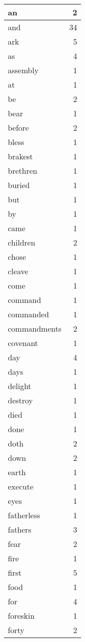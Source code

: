\begin{center}
\begin{longtable}{l|r}
an & 2 \\ \hline
and & 34 \\ \hline
ark & 5 \\ \hline
as & 4 \\ \hline
assembly & 1 \\ \hline
at & 1 \\ \hline
be & 2 \\ \hline
bear & 1 \\ \hline
before & 2 \\ \hline
bless & 1 \\ \hline
brakest & 1 \\ \hline
brethren & 1 \\ \hline
buried & 1 \\ \hline
but & 1 \\ \hline
by & 1 \\ \hline
came & 1 \\ \hline
children & 2 \\ \hline
chose & 1 \\ \hline
cleave & 1 \\ \hline
come & 1 \\ \hline
command & 1 \\ \hline
commanded & 1 \\ \hline
commandments & 2 \\ \hline
covenant & 1 \\ \hline
day & 4 \\ \hline
days & 1 \\ \hline
delight & 1 \\ \hline
destroy & 1 \\ \hline
died & 1 \\ \hline
done & 1 \\ \hline
doth & 2 \\ \hline
down & 2 \\ \hline
earth & 1 \\ \hline
execute & 1 \\ \hline
eyes & 1 \\ \hline
fatherless & 1 \\ \hline
fathers & 3 \\ \hline
fear & 2 \\ \hline
fire & 1 \\ \hline
first & 5 \\ \hline
food & 1 \\ \hline
for & 4 \\ \hline
foreskin & 1 \\ \hline
forty & 2 \\ \hline

\end{longtable}
\end{center}
